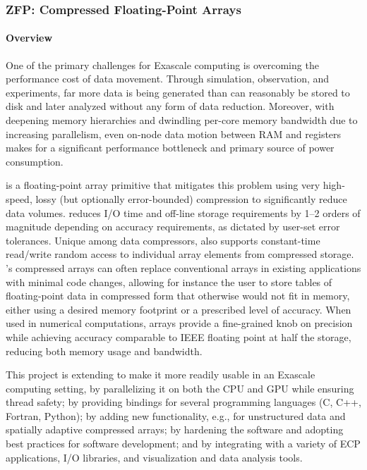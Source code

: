 \subsubsection{ ZFP: Compressed Floating-Point Arrays}

\paragraph{Overview} 

One of the primary challenges for Exascale computing is overcoming the
performance cost of data movement.  Through simulation, observation, and
experiments, far more data is being generated than can reasonably be stored
to disk and later analyzed without any form of data reduction.  Moreover,
with deepening memory hierarchies and dwindling per-core memory bandwidth
due to increasing parallelism, even on-node data motion between RAM and
registers makes for a significant performance bottleneck and primary source
of power consumption.

{\zfp} is a floating-point array primitive that mitigates this problem using
very high-speed, lossy (but optionally error-bounded) compression to
significantly reduce data volumes.  {\zfp} reduces I/O time and off-line
storage requirements by 1--2 orders of magnitude depending on accuracy
requirements, as dictated by user-set error tolerances.  Unique among data
compressors, {\zfp} also supports constant-time read/write random access to
individual array elements from compressed storage.  {\zfp}'s compressed arrays
can often replace conventional arrays in existing applications with minimal
code changes, allowing for instance the user to store tables of floating-point
data in compressed form that otherwise would not fit in memory, either using
a desired memory footprint or a prescribed level of accuracy.  When used in
numerical computations, {\zfp} arrays provide a fine-grained knob on precision
while achieving accuracy comparable to IEEE floating point at half the
storage, reducing both memory usage and bandwidth.

This project is extending {\zfp} to make it more readily usable in an Exascale
computing setting, by parallelizing it on both the CPU and GPU while ensuring
thread safety; by providing bindings for several programming languages (C,
C++, Fortran, Python); by adding new functionality, e.g., for unstructured
data and spatially adaptive compressed arrays; by hardening the software and
adopting best practices for software development; and by integrating {\zfp}
with a variety of ECP applications, I/O libraries, and visualization and data
analysis tools.


